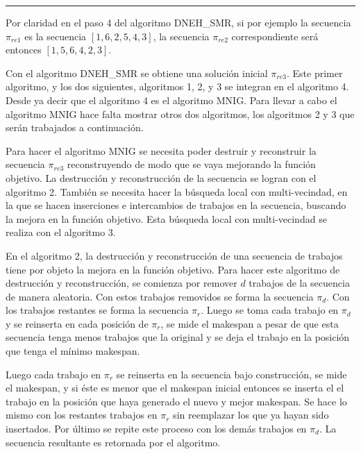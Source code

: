\documentclass{article}
\begin{document}
\noindent\noindent
\rule{\textwidth}{0.4pt}

\vspace{\baselineskip}
Por claridad en el paso 4 del algoritmo DNEH\_SMR, si por ejemplo la secuencia $\pi_{re1}$ es la secuencia $[1, 6, 2, 5, 4, 3]$, la secuencia $\pi_{re2}$ correspondiente será entonces $[1, 5, 6, 4, 2, 3]$. \autocite{algMNIG}

\vspace{\baselineskip}
Con el algoritmo DNEH\_SMR se obtiene una solución inicial $\pi_{re3}$. Este primer algoritmo, y los dos siguientes, algoritmos 1, 2, y 3 se integran en el algoritmo 4. Desde ya decir que el algoritmo 4 es el algoritmo MNIG. Para llevar a cabo el algoritmo MNIG hace falta mostrar otros dos algoritmos, los algoritmos 2 y 3 que serán trabajados a continuación.

\vspace{\baselineskip}
Para hacer el algoritmo MNIG se necesita poder destruir y reconstruir la secuencia $\pi_{re3}$ reconstruyendo de modo que se vaya mejorando la función objetivo. La destrucción y reconstrucción de la secuencia se logran con el algoritmo 2. También se necesita hacer la búsqueda local con multi-vecindad, en la que se hacen inserciones e intercambios de trabajos en la secuencia, buscando la mejora en la función objetivo. Esta búsqueda local con multi-vecindad se realiza con el algoritmo 3. \autocite{algMNIG}

\vspace{\baselineskip}
En el algoritmo 2, la destrucción y reconstrucción de una secuencia de trabajos tiene por objeto la mejora en la función objetivo. Para hacer este algoritmo de destrucción y reconstrucción, se comienza por remover $d$ trabajos de la secuencia de manera aleatoria. Con estos trabajos removidos se forma la secuencia $\pi_{d}$. Con los trabajos restantes se forma la secuencia $\pi_{r}$. Luego se toma cada trabajo en $\pi_{d}$ y se reinserta en cada posición de $\pi_{r}$, se mide el makespan a pesar de que esta secuencia tenga menos trabajos que la original y se deja el trabajo en la posición que tenga el mínimo makespan. \autocite{algMNIG}

\vspace{\baselineskip}
Luego cada trabajo en $\pi_{r}$ se reinserta en la secuencia bajo construcción, se mide el makespan, y si éste es menor que el makespan inicial entonces se inserta el el trabajo en la posición que haya generado el nuevo y mejor makespan. Se hace lo mismo con los restantes trabajos en $\pi_{r}$ sin reemplazar los que ya hayan sido insertados. Por último se repite este proceso con los demás trabajos en $\pi_{d}$. La secuencia resultante es retornada por el algoritmo. \autocite{algMNIG}
\end{document}
